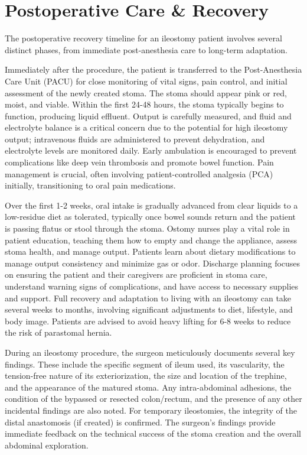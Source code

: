 \section*{Postoperative Care \& Recovery}
The postoperative recovery timeline for an ileostomy patient involves several distinct phases, from immediate post-anesthesia care to long-term adaptation.

Immediately after the procedure, the patient is transferred to the Post-Anesthesia Care Unit (PACU) for close monitoring of vital signs, pain control, and initial assessment of the newly created stoma. The stoma should appear pink or red, moist, and viable. Within the first 24-48 hours, the stoma typically begins to function, producing liquid effluent. Output is carefully measured, and fluid and electrolyte balance is a critical concern due to the potential for high ileostomy output; intravenous fluids are administered to prevent dehydration, and electrolyte levels are monitored daily. Early ambulation is encouraged to prevent complications like deep vein thrombosis and promote bowel function. Pain management is crucial, often involving patient-controlled analgesia (PCA) initially, transitioning to oral pain medications.

Over the first 1-2 weeks, oral intake is gradually advanced from clear liquids to a low-residue diet as tolerated, typically once bowel sounds return and the patient is passing flatus or stool through the stoma. Ostomy nurses play a vital role in patient education, teaching them how to empty and change the appliance, assess stoma health, and manage output. Patients learn about dietary modifications to manage output consistency and minimize gas or odor. Discharge planning focuses on ensuring the patient and their caregivers are proficient in stoma care, understand warning signs of complications, and have access to necessary supplies and support. Full recovery and adaptation to living with an ileostomy can take several weeks to months, involving significant adjustments to diet, lifestyle, and body image. Patients are advised to avoid heavy lifting for 6-8 weeks to reduce the risk of parastomal hernia.

During an ileostomy procedure, the surgeon meticulously documents several key findings. These include the specific segment of ileum used, its vascularity, the tension-free nature of its exteriorization, the size and location of the trephine, and the appearance of the matured stoma. Any intra-abdominal adhesions, the condition of the bypassed or resected colon/rectum, and the presence of any other incidental findings are also noted. For temporary ileostomies, the integrity of the distal anastomosis (if created) is confirmed. The surgeon's findings provide immediate feedback on the technical success of the stoma creation and the overall abdominal exploration.

